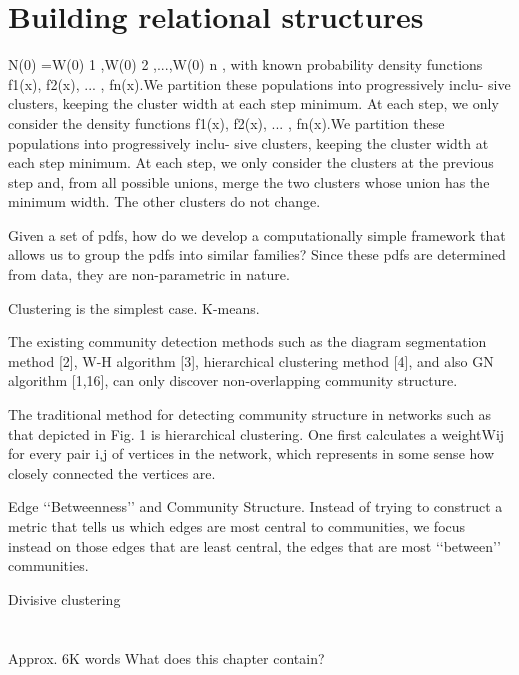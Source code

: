 \documentclass[../main.tex]{subfiles}
\begin{document}
\section{Building relational structures}\label{algorithms_review}

\cite{VoVan2010}
N(0) ={W(0)
1 ,W(0) 2 ,...,W(0) n }, with known probability
density functions {f1(x), f2(x), ... , fn(x)}.We partition these populations into progressively inclu- sive clusters, keeping the cluster width at each step minimum. At each step, we only consider the
density functions {f1(x), f2(x), ... , fn(x)}.We partition these populations into progressively inclu- sive clusters, keeping the cluster width at each step minimum. At each step, we only consider the
clusters at the previous step and, from all possible unions, merge the two clusters whose union
has the minimum width. The other clusters do not change.

\cite{Goh2008}
Given a set of pdfs, how do
we develop a computationally simple framework that allows us to group the pdfs into
similar families? Since these pdfs are determined from data, they are non-parametric in
nature.

\cite{hastie2008}
Clustering is the simplest case. K-means. 

\cite{Lu2012}
    The existing community detection methods such as the
diagram segmentation method [2], W-H algorithm [3], hierarchical clustering method [4], and also GN algorithm [1,16], can
only discover non-overlapping community
structure.


\cite{Girvan2002}
The traditional method for detecting community structure in networks such as that depicted in Fig. 1 is
hierarchical clustering. One first calculates a weightWij for every
pair i,j of vertices in the network, which represents in some sense
how closely connected the vertices are.


Edge ‘‘Betweenness’’ and Community Structure.
Instead of trying to construct a metric that tells us which
edges are most central to communities, we focus instead on those
edges that are least central, the edges that are most ‘‘between’’
communities.

\cite{hastie2008}
Divisive clustering
\section{}





Approx. 6K words
What does this chapter contain?
\end{document}
